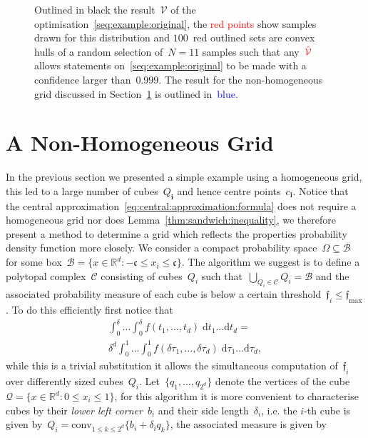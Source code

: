 \documentclass[letterpaper, 10pt, conference]{ieeeconf} %
\providecommand{\conv}{\text{conv}}
\providecommand{\bfa}[1]{\mathbf{#1}}
\begin{document}
\begin{figure}\centering

\caption{Outlined in black the result~$\mathcal V$ of the optimisation~\eqref{seq:example:original}, the \textcolor{red}{red points} show samples drawn for this distribution and $100$~red outlined sets are convex hulls of a random selection of~$N=11$ samples such that any~$\textcolor{red}{\hat{\mathcal V}}$ allows statements on~\eqref{seq:example:original} to be made with a confidence larger than~$0.999$.
%
The result for the non-homogeneous grid discussed in Section~\ref{sec:improved:grid} is outlined in~\textcolor{blue}{blue}.}
\label{fig:example:in:comparison}
\end{figure}
%
%
%
\section{A Non-Homogeneous Grid}\label{sec:improved:grid}
%
%
%
\noindent In the previous section we presented a simple example using a homogeneous grid, this led to a large number of cubes~$Q_\bfa{i}$ and hence centre points~$c_\bfa{i}$.
%
Notice that the central approximation~\eqref{eq:central:approximation:formula} does not require a homogeneous grid nor does Lemma~\ref{thm:sandwich:inequality}, we therefore present a method to determine a grid which reflects the properties probability density function more closely.
%
We consider a compact probability space~$\Omega\subseteq\mathcal B$ for some box~$\mathcal B=\{x\in\mathbb R^d:-\mathfrak{c}\leq x_i\leq \mathfrak{c}\}$.
%
The algorithm we suggest is to define a polytopal complex~$\mathcal C$ consisting of cubes~$Q_i$ such that~$\bigcup_{Q_i\in\mathcal C}Q_i=\mathcal B$ and the associated probability measure of each cube is below a certain threshold~$\mathfrak{f}_i\leq\mathfrak{f}_{\max}$.
%
To do this efficiently first notice that
\begin{multline*}
\int_0^{\delta}\dots\int_0^\delta f(t_1,\dots,t_d)\; \mathrm d t_1\dots \mathrm dt _d = \\ \delta^d\int_0^1\dots\int_0^1f(\delta\tau_1,\dots,\delta\tau_d)
\; \mathrm d\tau_1\dots \mathrm d\tau_d, 
\end{multline*}
while this is a trivial substitution it allows the simultaneous computation of~$\mathfrak{f}_i$ over differently sized cubes~$Q_i$.
%
Let~$\{q_1,\dots,q_{2^d}\}$ denote the vertices of the cube~$\mathcal Q=\{x\in\mathbb R^d: 0\leq x_i\leq 1\}$, for this algorithm it is more convenient to characterise cubes by their \emph{lower left corner}~$b_i$ and their side length~$\delta_i$, i.e. the $i$-th cube is given by~$Q_i=\conv_{1\leq k\leq2^d}\{b_i+\delta_i q_k\}$, the associated measure is given by
\end{document}
